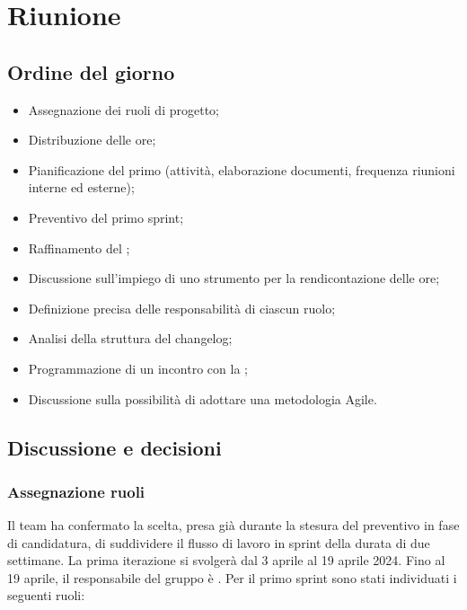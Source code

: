 \section{Riunione}
\subsection{Ordine del giorno}
\begin{itemize}
	\item Assegnazione dei ruoli di progetto;
	\item Distribuzione delle ore;
	\item Pianificazione del primo  (attività, elaborazione documenti, frequenza riunioni interne ed esterne);
	\item Preventivo del primo sprint;
	\item Raffinamento del \glossario{\WoW};
	\item Discussione sull'impiego di uno strumento per la rendicontazione delle ore;
	\item Definizione precisa delle responsabilità di ciascun ruolo;
	\item Analisi della struttura del changelog;
	\item Programmazione di un incontro con la ;
	\item Discussione sulla possibilità di adottare una metodologia Agile.
\end{itemize}

\subsection{Discussione e decisioni}

\subsubsection{Assegnazione ruoli}
Il team ha confermato la scelta, presa già durante la stesura del preventivo in fase di candidatura, di suddividere il flusso di lavoro in sprint della durata di due settimane. La prima iterazione si svolgerà dal 3 aprile al 19 aprile 2024. Fino al 19 aprile, il responsabile del gruppo è \riccardo. Per il primo sprint sono stati individuati i seguenti ruoli:

